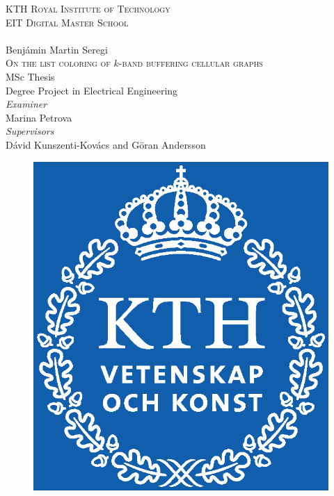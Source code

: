 \documentclass[a4paper, 12pt]{article}
\begin{document}
\thispagestyle{empty}
\begin{center}\renewcommand\baselinestretch{0.9}
{\Large \textsc{KTH Royal Institute of Technology}\\\textsc{EIT Digital Master School}\\} \hrulefill
\vspace{1.0cm} {\huge \\ Benjámin Martin Seregi \\} \vspace{1cm}
{\Huge\textsc{On the list coloring of $k$-band buffering cellular graphs}\\ \vspace{0.5cm}}
{\large\textsc MSc Thesis \\ Degree Project in Electrical Engineering}\\ \vspace{1cm}
{\large \textit{Examiner}\\
\vspace{0.2cm}
Marina Petrova\vspace{1.2cm}}\\
{\large \textit{Supervisors}\\
\vspace{0.2cm}
Dávid Kunszenti-Kovács and Göran Andersson\vspace{1.2cm}}\\
\begin{figure}[!h]
\begin{center}
\resizebox{5.5cm}{!}
{\includegraphics{KTH_Logotyp_RGB_2013}}

\end{center}
\end{figure}
\end{center}
\end{document}
